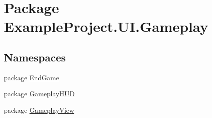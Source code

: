 \hypertarget{namespace_example_project_1_1_u_i_1_1_gameplay}{}\section{Package Example\+Project.\+U\+I.\+Gameplay}
\label{namespace_example_project_1_1_u_i_1_1_gameplay}
\subsection*{Namespaces}
\begin{DoxyCompactItemize}
\item 
package \hyperlink{namespace_example_project_1_1_u_i_1_1_gameplay_1_1_end_game}{End\+Game}
\item 
package \hyperlink{namespace_example_project_1_1_u_i_1_1_gameplay_1_1_gameplay_h_u_d}{Gameplay\+H\+U\+D}
\item 
package \hyperlink{namespace_example_project_1_1_u_i_1_1_gameplay_1_1_gameplay_view}{Gameplay\+View}
\end{DoxyCompactItemize}
